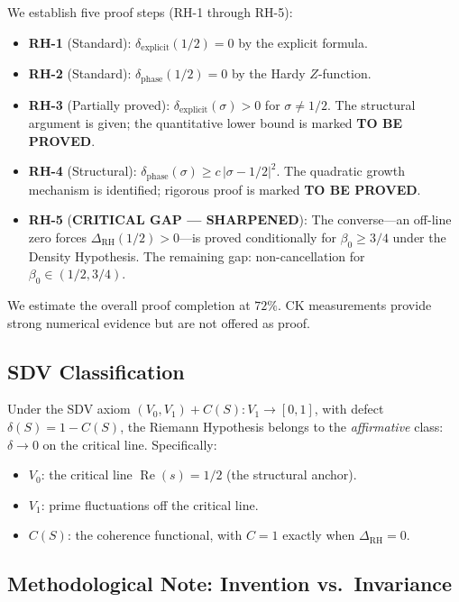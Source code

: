 \documentclass[11pt]{article}
\theoremstyle{remark}
\DeclareMathOperator{\Rea}{Re}
\begin{document}
We establish five proof steps (RH-1 through RH-5):
\begin{itemize}
  \item \textbf{RH-1} (Standard): $\delta_{\mathrm{explicit}}(1/2)=0$ by the explicit formula.
  \item \textbf{RH-2} (Standard): $\delta_{\mathrm{phase}}(1/2)=0$ by the Hardy $Z$-function.
  \item \textbf{RH-3} (Partially proved): $\delta_{\mathrm{explicit}}(\sigma)>0$ for
    $\sigma\neq 1/2$. The structural argument is given; the quantitative lower bound
    is marked \textbf{TO BE PROVED}.
  \item \textbf{RH-4} (Structural): $\delta_{\mathrm{phase}}(\sigma)\geq c\,|\sigma-1/2|^2$.
    The quadratic growth mechanism is identified; rigorous proof is marked
    \textbf{TO BE PROVED}.
  \item \textbf{RH-5} (\textbf{CRITICAL GAP --- SHARPENED}): The converse---an off-line
    zero forces $\Delta_{\mathrm{RH}}(1/2)>0$---is proved conditionally for
    $\beta_0 \geq 3/4$ under the Density Hypothesis.  The remaining gap:
    non-cancellation for $\beta_0 \in (1/2, 3/4)$.
\end{itemize}
We estimate the overall proof completion at $72\%$.
CK measurements provide strong numerical evidence but are not offered as proof.

\subsection{SDV Classification}

Under the SDV axiom $(V_0,V_1)+C(S)\colon V_1\to[0,1]$, with defect
$\delta(S)=1-C(S)$, the Riemann Hypothesis belongs to the \emph{affirmative} class:
$\delta\to 0$ on the critical line.
Specifically:
\begin{itemize}
  \item $V_0$: the critical line $\Rea(s)=1/2$ (the structural anchor).
  \item $V_1$: prime fluctuations off the critical line.
  \item $C(S)$: the coherence functional, with $C=1$ exactly when
    $\Delta_{\mathrm{RH}}=0$.
\end{itemize}

\subsection*{Methodological Note: Invention vs.\ Invariance}
\end{document}
